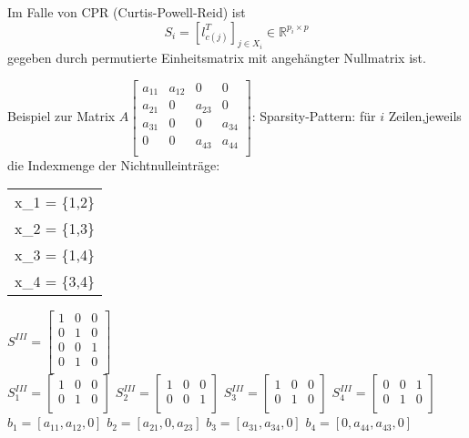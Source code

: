 Im Falle von CPR (Curtis-Powell-Reid) ist\\
$$S_i = \left[l^T_{c(j)}\right]_{j\in X_i}\in \mathbb{R}^{p_i\times p}$$
gegeben durch permutierte Einheitsmatrix mit angehängter Nullmatrix ist.


Beispiel zur Matrix $A\begin{bmatrix}
a_{11}	& a_{12}	& 0	& 0	\\
a_{21}	& 0	& a_{23}	& 0	\\
a_{31}	& 0	& 0	& a_{34}	\\
0	& 0	& a_{43}	& a_{44}	\\
\end{bmatrix}$:
Sparsity-Pattern: für $i$ Zeilen,jeweils die Indexmenge der Nichtnulleinträge:\\
\begin{tabular}{L}
	x_1 = \{1,2\}\\
	x_2 = \{1,3\}\\
	x_3 = \{1,4\}\\
	x_4 = \{3,4\}\\
\end{tabular}
$S^{III} = \begin{bmatrix}
1	& 0	& 0	\\
0	& 1	& 0	\\
0	& 0	& 1	\\
0	& 1	& 0	\\
\end{bmatrix}
$\\
$S_1^{III} = \begin{bmatrix}
1	& 0	& 0	\\
0	& 1	& 0	\\
\end{bmatrix}$
$S_2^{III} = \begin{bmatrix}
1	& 0	& 0	\\
0	& 0	& 1	\\
\end{bmatrix}$
$S_3^{III} = \begin{bmatrix}
1	& 0	& 0	\\
0	& 1	& 0	\\
\end{bmatrix}$
$S_4^{III} = \begin{bmatrix}
0	& 0	& 1	\\
0	& 1	& 0	\\
\end{bmatrix}$\\
$b_1 = [a_{11}, a_{12},0]$
$b_2 = [a_{21}, 0, a_{23}]$
$b_3 = [a_{31}, a_{34},0]$
$b_4 = [0,a_{44}, a_{43},0]$\\

